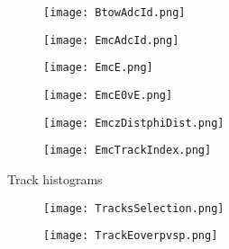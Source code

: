 \documentclass{beamer}
\begin{document}
\begin{frame}
  \begin{figure}[h!]
  \centering
  \texttt{[image: BtowAdcId.png]}
  \end{figure}
\end{frame}

\begin{frame}
  \begin{figure}[h!]
  \centering
  \texttt{[image: EmcAdcId.png]}
  \end{figure}
\end{frame}

\begin{frame}
  \begin{figure}[h!]
  \centering
  \texttt{[image: EmcE.png]}
  \end{figure}
\end{frame}

\begin{frame}
  \begin{figure}[h!]
  \centering
  \texttt{[image: EmcE0vE.png]}
  \end{figure}
\end{frame}

\begin{frame}
  \begin{figure}[h!]
  \centering
  \texttt{[image: EmczDistphiDist.png]}
  \end{figure}
\end{frame}

\begin{frame}
  \begin{figure}[h!]
  \centering
  \texttt{[image: EmcTrackIndex.png]}
  \end{figure}
\end{frame}

\begin{frame}
  \begin{center}
 	\Huge Track histograms
 	\end{center}
\end{frame}

\begin{frame}
  \begin{figure}[h!]
  \centering
  \texttt{[image: TracksSelection.png]}
  \end{figure}
\end{frame}

\begin{frame}
  \begin{figure}[h!]
  \centering
  \texttt{[image: TrackEoverpvsp.png]}
  \end{figure}
\end{frame}
\end{document}

